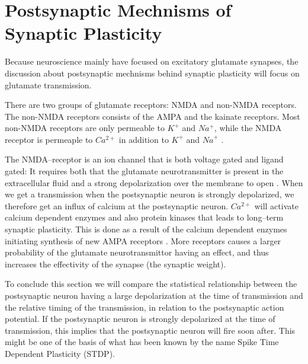 \section{Postsynaptic Mechnisms of Synaptic Plasticity}
\label{appendixSynPlast:postsynapticMechanisms}
Because neuroscience mainly have focused on excitatory glutamate synapses, the discussion about postsynaptic mechnisms behind synaptic plasticity will focus on glutamate transmission.

There are two groups of glutamate receptors: NMDA and non-NMDA receptors. 
The non-NMDA receptors consists of the AMPA and the kainate receptors. 
Most non-NMDA receptors are only permeable to $K^+$ and $Na^+$, while the NMDA receptor is permeaple to $Ca^{2+}$ in addition to $K^+$ and ${Na}^+$ \cite{PrinciplesOfNeuralScience4edKAP12}. 


The NMDA--receptor is an ion channel that is both voltage gated and ligand gated: 
	It requires both that the glutamate neurotransmitter is present in the extracellular fluid and a strong depolarization over the membrane to open \cite{PrinciplesOfNeuralScience4edKAP12}. 
When we get a transmission when the postsynaptic neuron is strongly depolarized, we therefore get an influx of calcium at the postsynaptic neuron.
$Ca^{2+}$ will activate calcium dependent enzymes and also protein kinases that leads to long--term synaptic plasticity\cite{PrinciplesOfNeuralScience4edKAP12}.
This is done as a result of the calcium dependent enzymes initiating synthesis of new AMPA receptors \cite{AMPARtrafficingArtikkel}. 
More receptors causes a larger probability of the glutamate neurotransmittor having an effect, and thus increases the effectivity of the synapse (the synaptic weight).

To conclude this section we will compare the statistical relationship between the postsynaptic neuron having a large depolarization at the time of transmission and the relative timing of the transmission, 
	in relation to the postsynaptic action potential. 
If the postsynaptic neuron is strongly depolarized at the time of transmission, this implies that the postsynaptic neuron will fire soon after.
This might be one of the basis of what has been known by the name Spike Time Dependent Plasticity (STDP).

